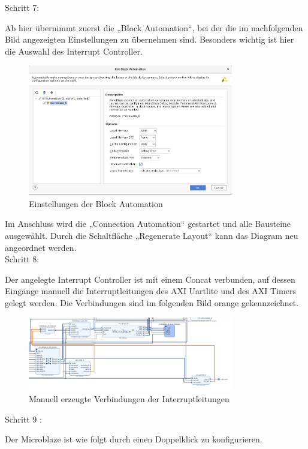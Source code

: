Schritt 7:

Ab hier übernimmt zuerst die „Block Automation“, bei der die im nachfolgenden Bild angezeigten Einstellungen zu übernehmen sind.
Besonders wichtig ist hier die Auswahl des Interrupt Controller.

\begin{figure}[H]
\centering
\includegraphics[width=0.8\textwidth]{Hauptteil/schritt7.png}
\caption{Einstellungen der Block Automation}
\label{fig:mbschritt7}
\end{figure}


Im Anschluss wird die „Connection Automation“ gestartet und alle Bausteine ausgewählt.
Durch die Schaltfläche „Regenerate Layout“ kann das Diagram neu angeordnet werden.\\

Schritt 8:

Der angelegte Interrupt Controller ist mit einem Concat verbunden, auf dessen Eingänge manuell die Interruptleitungen des AXI Uartlite und des AXI Timers gelegt werden.
Die Verbindungen sind im folgenden Bild orange gekennzeichnet.

\begin{figure}[H]
\centering
\includegraphics[width=0.8\textwidth]{Hauptteil/Schritt8.png}
\caption{Manuell erzeugte Verbindungen der Interruptleitungen}
\label{fig:mbschritt8}
\end{figure}

Schritt 9 :

Der Microblaze ist wie folgt durch einen Doppelklick zu konfigurieren.

